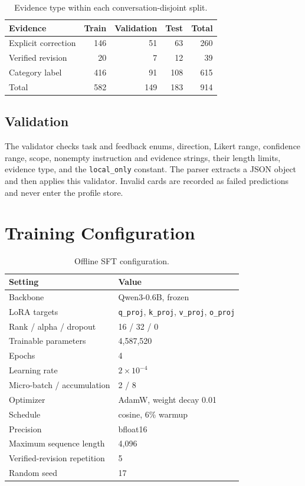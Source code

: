 \documentclass{article}
\begin{document}
\begin{table}[H]
\centering
\small
\caption{Evidence type within each conversation-disjoint split.}
\label{tab:evidence-split}
\begin{tabular}{lrrrr}
\toprule
\rowcolor{pamber!25}
Evidence & Train & Validation & Test & Total \\
\midrule
Explicit correction & 146 & 51 & 63 & 260 \\
Verified revision & 20 & 7 & 12 & 39 \\
Category label & 416 & 91 & 108 & 615 \\
\midrule
Total & 582 & 149 & 183 & 914 \\
\bottomrule
\end{tabular}
\end{table}

\subsection{Validation}

The validator checks task and feedback enums, direction, Likert range,
confidence range, scope, nonempty instruction and evidence strings, their
length limits, evidence type, and the \texttt{local\_only} constant. The parser
extracts a JSON object and then applies this validator. Invalid cards are
recorded as failed predictions and never enter the profile store.

\section{Training Configuration}
\label{app:training}

\begin{table}[H]
\centering
\small
\caption{Offline SFT configuration.}
\label{tab:training}
\begin{tabular}{ll}
\toprule
\rowcolor{pcyan!25}
Setting & Value \\
\midrule
Backbone & Qwen3-0.6B, frozen \\
LoRA targets & \texttt{q\_proj}, \texttt{k\_proj}, \texttt{v\_proj}, \texttt{o\_proj} \\
Rank / alpha / dropout & 16 / 32 / 0 \\
Trainable parameters & 4,587,520 \\
Epochs & 4 \\
Learning rate & $2\times10^{-4}$ \\
Micro-batch / accumulation & 2 / 8 \\
Optimizer & AdamW, weight decay 0.01 \\
Schedule & cosine, 6\% warmup \\
Precision & bfloat16 \\
Maximum sequence length & 4,096 \\
Verified-revision repetition & 5 \\
Random seed & 17 \\
\bottomrule
\end{tabular}
\end{table}
\end{document}
